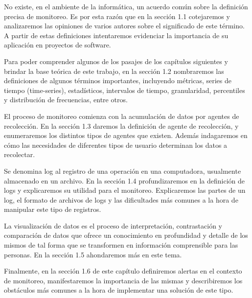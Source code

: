 No existe, en el ambiente de la informática, un acuerdo común sobre la
definición precisa de monitoreo. Es por esta razón que en la sección 1.1
cotejaremos y analizaremos las opiniones de varios autores sobre el significado
de este término. A partir de estas definiciones intentaremos evidenciar la
importancia de su aplicación en proyectos de software.

Para poder comprender algunos de los pasajes de los capítulos siguientes y
brindar la base teórica de este trabajo, en la sección 1.2 nombraremos las
definiciones de algunos términos importantes, incluyendo métricas, series de
tiempo (time-series), estadísticos, intervalos de tiempo, granularidad,
percentiles y distribución de frecuencias, entre otros.

El proceso de monitoreo comienza con la acumulación de datos por agentes de
recolección. En la sección 1.3 daremos la definición de agente de recolección,
y enumeraremos los distintos tipos de agentes que existen. Además indagaremos
en cómo las necesidades de diferentes tipos de usuario determinan los datos a
recolectar.

Se denomina log al registro de una operación en una computadora, usualmente
almacenado en un archivo. En la sección 1.4 profundizaremos en la definición de
logs y explicaremos su utilidad para el monitoreo. Explicaremos las partes de
un log, el formato de archivos de logs y las dificultades más comunes a la hora
de manipular este tipo de registros.

La visualización de datos es el proceso de interpretación, contrastación y
comparación de datos que ofrece un conocimiento en profundidad y detalle de
los mismos de tal forma que se transformen en información comprensible para las
personas. En la sección 1.5 ahondaremos más en este tema.

Finalmente, en la sección 1.6 de este capítulo definiremos alertas en el
contexto de monitoreo, manifestaremos la importancia de las mismas y
describiremos los obstáculos más comunes a la hora de implementar una solución
de este tipo.

